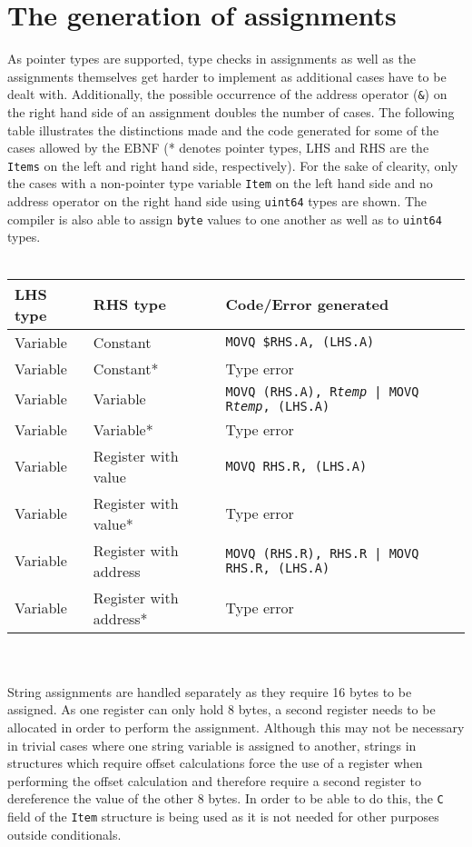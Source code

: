 \documentclass[a4paper]{scrreprt}
\begin{document}
    \section{The generation of assignments}
      As pointer types are supported, type checks in assignments as well as the assignments themselves get harder to implement as additional cases have to be dealt with. Additionally, the possible occurrence of the address operator (\texttt{\&}) on the right hand side of an assignment doubles the number of cases. The following table illustrates the distinctions made and the code generated for some of the cases allowed by the EBNF (* denotes pointer types, LHS and RHS are the \texttt{Items} on the left and right hand side, respectively). For the sake of clearity, only the cases with a non-pointer type variable \texttt{Item} on the left hand side and no address operator on the right hand side using \texttt{uint64} types are shown. The compiler is also able to assign \texttt{byte} values to one another as well as to \texttt{uint64} types.\\ \\
      \begin{tabular}{|l|l|l|}
        \hline
        \textbf{LHS type} & \textbf{RHS type} & \textbf{Code/Error generated}\\ \hline
        Variable & Constant & \texttt{MOVQ \$RHS.A, (LHS.A)}\\ \hline
        Variable & Constant* & Type error\\ \hline
        Variable & Variable & \texttt{MOVQ (RHS.A), R\textit{temp} | MOVQ R\textit{temp}, (LHS.A)}\\ \hline
        Variable & Variable* & Type error\\ \hline
        Variable & Register with value & \texttt{MOVQ RHS.R, (LHS.A)}\\ \hline
        Variable & Register with value* & Type error\\ \hline
        Variable & Register with address & \texttt{MOVQ (RHS.R), RHS.R | MOVQ RHS.R, (LHS.A)}\\ \hline
        Variable & Register with address* & Type error\\ \hline
      \end{tabular}\\ \\
      String assignments are handled separately as they require 16 bytes to be assigned. As one register can only hold 8 bytes, a second register needs to be allocated in order to perform the assignment. Although this may not be necessary in trivial cases where one string variable is assigned to another, strings in structures which require offset calculations force the use of a register when performing the offset calculation and therefore require a second register to dereference the value of the other 8 bytes. In order to be able to do this, the \texttt{C} field of the \texttt{Item} structure is being used as it is not needed for other purposes outside conditionals.
\end{document}

